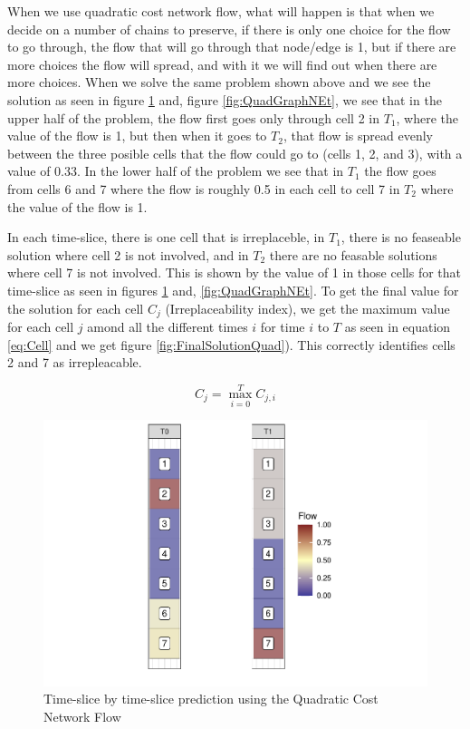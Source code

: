 \documentclass[]{article}
\begin{document}
When we use quadratic cost network flow, what will happen is that when we decide on a number of chains to preserve, if there is only one choice for the flow to go through, the flow that will go through that node/edge is 1, but if there are more choices the flow will spread, and with it we will find out when there are more choices. When we solve the same problem shown above and we see the solution as seen in figure \ref{fig:FinalStackQuad} and, figure \ref{fig:QuadGraphNEt}, we see that in the upper half of the problem, the flow first goes only through cell 2 in \(T_1\), where the value of the flow is 1, but then when it goes to \(T_2\), that flow is spread evenly between the three posible cells that the flow could go to (cells 1, 2, and 3), with a value of 0.33. In the lower half of the problem we see that in \(T_1\) the flow goes from cells 6 and 7 where the flow is roughly 0.5 in each cell to cell 7 in \(T_2\) where the value of the flow is 1.

In each time-slice, there is one cell that is irreplaceble, in \(T_1\), there is no feaseable solution where cell 2 is not involved, and in \(T_2\) there are no feasable solutions where cell 7 is not involved. This is shown by the value of 1 in those cells for that time-slice as seen in figures \ref{fig:FinalStackQuad} and, \ref{fig:QuadGraphNEt}. To get the final value for the solution for each cell \(C_j\) (Irreplaceability index), we get the maximum value for each cell \(j\) amond all the different times \(i\) for time \(i\) to \(T\) as seen in equation \eqref{eq:Cell} and we get figure \ref{fig:FinalSolutionQuad}). This correctly identifies cells 2 and 7 as irrepleacable.

\begin{equation} 
  C_j = \max_{i = 0}^T{C_{j,i}}
  \label{eq:Cell}
\end{equation}

\begin{figure}
\centering
\includegraphics{TagetBasedNew_files/figure-latex/FinalStackQuad-1.pdf}
\caption{\label{fig:FinalStackQuad}Time-slice by time-slice prediction using the Quadratic Cost Network Flow}
\end{figure}
\end{document}
